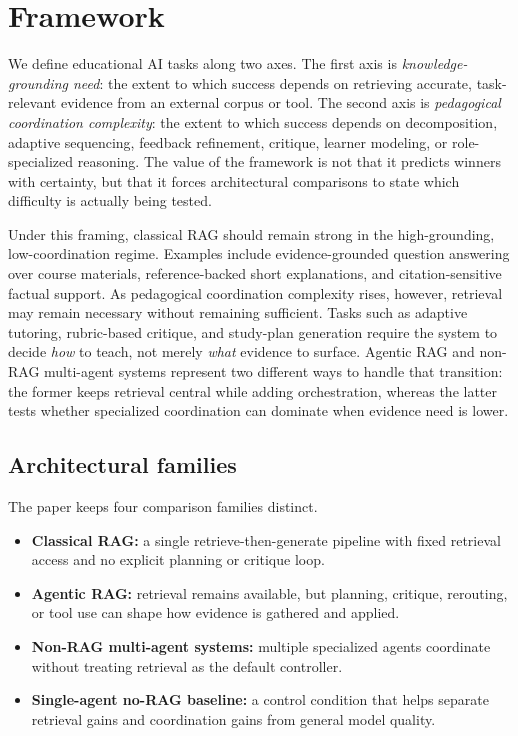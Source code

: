 \section{Framework}

We define educational AI tasks along two axes. The first axis is \emph{knowledge-grounding need}: the extent to which success depends on retrieving accurate, task-relevant evidence from an external corpus or tool. The second axis is \emph{pedagogical coordination complexity}: the extent to which success depends on decomposition, adaptive sequencing, feedback refinement, critique, learner modeling, or role-specialized reasoning. The value of the framework is not that it predicts winners with certainty, but that it forces architectural comparisons to state which difficulty is actually being tested.

Under this framing, classical RAG should remain strong in the high-grounding, low-coordination regime. Examples include evidence-grounded question answering over course materials, reference-backed short explanations, and citation-sensitive factual support. As pedagogical coordination complexity rises, however, retrieval may remain necessary without remaining sufficient. Tasks such as adaptive tutoring, rubric-based critique, and study-plan generation require the system to decide \emph{how} to teach, not merely \emph{what} evidence to surface. Agentic RAG and non-RAG multi-agent systems represent two different ways to handle that transition: the former keeps retrieval central while adding orchestration, whereas the latter tests whether specialized coordination can dominate when evidence need is lower.

\subsection{Architectural families}

The paper keeps four comparison families distinct.

\begin{itemize}[leftmargin=*]
    \item \textbf{Classical RAG:} a single retrieve-then-generate pipeline with fixed retrieval access and no explicit planning or critique loop.
    \item \textbf{Agentic RAG:} retrieval remains available, but planning, critique, rerouting, or tool use can shape how evidence is gathered and applied.
    \item \textbf{Non-RAG multi-agent systems:} multiple specialized agents coordinate without treating retrieval as the default controller.
    \item \textbf{Single-agent no-RAG baseline:} a control condition that helps separate retrieval gains and coordination gains from general model quality.
\end{itemize}

